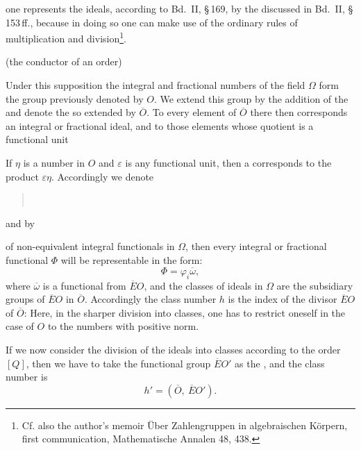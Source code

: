 
one represents the ideals, according to Bd.~II, \S\,169, by the  discussed in Bd.~II, \S\,153\,ff., because in doing so one can make use of the ordinary rules of multiplication and division\footnote{Cf. also the author's memoir \glqq Über Zahlengruppen in algebraischen Körpern\grqq{}, first communication, Mathematische Annalen 48, 438.}.

 (the conductor of an order)

Under this supposition the integral and fractional numbers of the field $\Omega$ form the group previously denoted by $O$. We extend this group by the addition of the  and denote the  so extended by $\overline{O}$. To every element of $\overline{O}$ there then corresponds an integral or fractional ideal, and to those elements whose quotient is a functional unit 

If $\eta$ is a number in $O$ and $\varepsilon$ is any functional unit, then a  corresponds to the product $\varepsilon\eta$. Accordingly we denote
\begin{quote}
\\
\end{quote}
and by
\begin{quote}
\end{quote}
of non-equivalent integral functionals in $\Omega$, then every integral or fractional functional $\Phi$ will be representable in the form:
\[
\Phi = \varphi_i \overline{\omega},
\]
where $\overline{\omega}$ is a functional from $\overline{E}O$, and the classes of ideals in $\Omega$ are the subsidiary groups of $\overline{E}O$ in $\overline{O}$. Accordingly the class number $h$ is the index of the divisor $\overline{E}O$ of $\overline{O}$:
Here, in the sharper division into classes, one has to restrict oneself in the case of $O$ to the numbers with positive norm.

If we now consider the division of the ideals into classes according to the order $[Q]$, then we have to take the functional group $\overline{E}O'$ as the , and the class number is
\[
h' = (\overline{O},\ \overline{E}O').
\]
